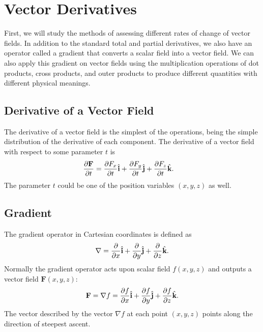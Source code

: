\section{Vector Derivatives}

First, we will study the methods of assessing different rates of change of vector fields. In addition to the standard total and partial derivatives, we also have an operator called a gradient that converts a scalar field into a vector field. We can also apply this gradient on vector fields using the multiplication operations of dot products, cross products, and outer products to produce different quantities with different physical meanings. 

\subsection{Derivative of a Vector Field}

The derivative of a vector field is the simplest of the operations, being the simple distribution of the derivative of each component. The derivative of a vector field with respect to some parameter $t$ is
\begin{align}
  \frac{ \partial {\mathbf{F}} }{ \partial {t} } &= \frac{ \partial {F_x} }{ \partial {t} } \hat{\mathbf{i}} + \frac{ \partial {F_y} }{ \partial {t} } \hat{\mathbf{j}} + \frac{ \partial {F_z} }{ \partial {t} } \hat{\mathbf{k}}.
\end{align}
The parameter $t$ could be one of the position variables $(x,y,z)$ as well.

\subsection{Gradient}

The gradient operator in Cartesian coordinates is defined as
\begin{align}
  \nabla = \frac{ \partial {} }{ \partial {x} } \hat{\mathbf{i}} + \frac{ \partial {} }{ \partial {y} } \hat{\mathbf{j}} + \frac{ \partial {} }{ \partial {z} } \hat{\mathbf{k}} .
\end{align}
Normally the gradient operator acts upon scalar field $f(x,y,z)$ and outputs a vector field $\mathbf{F}(x,y,z)$:
\begin{align}
  \mathbf{F} = \nabla f = \frac{ \partial {f} }{ \partial {x} } \hat{\mathbf{i}} + \frac{ \partial {f} }{ \partial {y} } \hat{\mathbf{j}} + \frac{ \partial {f} }{ \partial {z} } \hat{\mathbf{k}} .
\end{align}
The vector described by the vector $\nabla f$ at each point $(x,y,z)$ points along the direction of steepest ascent.

